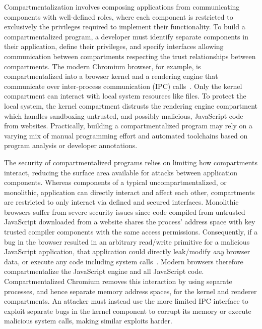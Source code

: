 Compartmentalization involves composing applications from communicating 
components with well-defined roles, where each component is restricted to exclusively the 
privileges required to implement their functionality.
To build a compartmentalized program, a developer must identify separate
components in their application, define their privileges, and specify interfaces
allowing communication between compartments respecting the trust relationships
between compartments.
The modern Chromium browser, for example, is compartmentalized into a 
browser kernel and a rendering engine that communicate over 
inter-process communication (IPC) calls~\cite{barth2008security}.
Only the kernel compartment can interact with local system resources like files.
To protect the local system, the kernel compartment distrusts the 
rendering engine compartment which handles sandboxing 
untrusted, and possibly malicious, JavaScript code from websites.
Practically, building a compartmentalized program may rely on a varying mix of
manual programming effort and automated toolchains based on program analysis or
developer annotations.

The security of compartmentalized programs relies on limiting how compartments
interact, reducing the surface area available for attacks between application
components.
Whereas components of a typical uncompartmentalized, or monolithic, application
can directly interact and affect each other, 
compartments are restricted to only interact via defined and secured interfaces.
Monolithic browsers suffer from severe security issues since code 
compiled from untrusted JavaScript downloaded from a website shares the 
process' address space with key trusted compiler components with
the same access permissions.
Consequently, if a bug in the browser resulted in an arbitrary read/write primitive for
a malicious JavaScript application, that application could directly leak/modify
\emph{any} browser data, or 
execute any code including system calls~\cite{ProvosMMWM07, ProvosMRM08}.
Modern browsers therefore compartmentalize the JavaScript engine and all JavaScript code.
Compartmentalized Chromium removes this interaction by using separate processes,
and hence separate memory address spaces, for the kernel and renderer 
compartments.
An attacker must instead use the more limited IPC interface to exploit separate
bugs in the kernel component to corrupt its memory or execute 
malicious system calls, making similar exploits harder.

